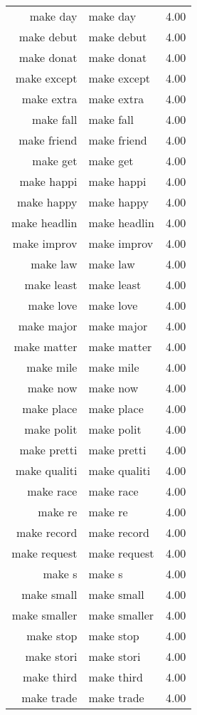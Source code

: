 \begin{table}[ht]
\begin{tabular}{rlr}
  make day & make day & 4.00 \\ 
  make debut & make debut & 4.00 \\ 
  make donat & make donat & 4.00 \\ 
  make except & make except & 4.00 \\ 
  make extra & make extra & 4.00 \\ 
  make fall & make fall & 4.00 \\ 
  make friend & make friend & 4.00 \\ 
  make get & make get & 4.00 \\ 
  make happi & make happi & 4.00 \\ 
  make happy & make happy & 4.00 \\ 
  make headlin & make headlin & 4.00 \\ 
  make improv & make improv & 4.00 \\ 
  make law & make law & 4.00 \\ 
  make least & make least & 4.00 \\ 
  make love & make love & 4.00 \\ 
  make major & make major & 4.00 \\ 
  make matter & make matter & 4.00 \\ 
  make mile & make mile & 4.00 \\ 
  make now & make now & 4.00 \\ 
  make place & make place & 4.00 \\ 
  make polit & make polit & 4.00 \\ 
  make pretti & make pretti & 4.00 \\ 
  make qualiti & make qualiti & 4.00 \\ 
  make race & make race & 4.00 \\ 
  make re & make re & 4.00 \\ 
  make record & make record & 4.00 \\ 
  make request & make request & 4.00 \\ 
  make s & make s & 4.00 \\ 
  make small & make small & 4.00 \\ 
  make smaller & make smaller & 4.00 \\ 
  make stop & make stop & 4.00 \\ 
  make stori & make stori & 4.00 \\ 
  make third & make third & 4.00 \\ 
  make trade & make trade & 4.00 \\ 

\end{tabular}
\end{table}
